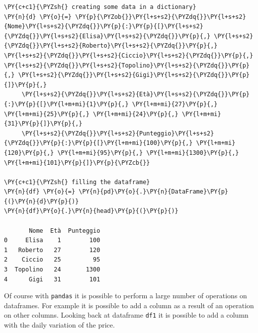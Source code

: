 \begin{tcolorbox}[breakable, size=fbox, boxrule=1pt, pad at break*=1mm,colback=cellbackground, colframe=cellborder]
\begin{Verbatim}[commandchars=\\\{\}]
\PY{c+c1}{\PYZsh{} creating some data in a dictionary}
\PY{n}{d} \PY{o}{=} \PY{p}{\PYZob{}}\PY{l+s+s2}{\PYZdq{}}\PY{l+s+s2}{Nome}\PY{l+s+s2}{\PYZdq{}}\PY{p}{:}\PY{p}{[}\PY{l+s+s2}{\PYZdq{}}\PY{l+s+s2}{Elisa}\PY{l+s+s2}{\PYZdq{}}\PY{p}{,} \PY{l+s+s2}{\PYZdq{}}\PY{l+s+s2}{Roberto}\PY{l+s+s2}{\PYZdq{}}\PY{p}{,} \PY{l+s+s2}{\PYZdq{}}\PY{l+s+s2}{Ciccio}\PY{l+s+s2}{\PYZdq{}}\PY{p}{,} \PY{l+s+s2}{\PYZdq{}}\PY{l+s+s2}{Topolino}\PY{l+s+s2}{\PYZdq{}}\PY{p}{,} \PY{l+s+s2}{\PYZdq{}}\PY{l+s+s2}{Gigi}\PY{l+s+s2}{\PYZdq{}}\PY{p}{]}\PY{p}{,}
     \PY{l+s+s2}{\PYZdq{}}\PY{l+s+s2}{Età}\PY{l+s+s2}{\PYZdq{}}\PY{p}{:}\PY{p}{[}\PY{l+m+mi}{1}\PY{p}{,} \PY{l+m+mi}{27}\PY{p}{,} \PY{l+m+mi}{25}\PY{p}{,} \PY{l+m+mi}{24}\PY{p}{,} \PY{l+m+mi}{31}\PY{p}{]}\PY{p}{,}
     \PY{l+s+s2}{\PYZdq{}}\PY{l+s+s2}{Punteggio}\PY{l+s+s2}{\PYZdq{}}\PY{p}{:}\PY{p}{[}\PY{l+m+mi}{100}\PY{p}{,} \PY{l+m+mi}{120}\PY{p}{,} \PY{l+m+mi}{95}\PY{p}{,} \PY{l+m+mi}{1300}\PY{p}{,} \PY{l+m+mi}{101}\PY{p}{]}\PY{p}{\PYZcb{}}

\PY{c+c1}{\PYZsh{} filling the dataframe}
\PY{n}{df} \PY{o}{=} \PY{n}{pd}\PY{o}{.}\PY{n}{DataFrame}\PY{p}{(}\PY{n}{d}\PY{p}{)}
\PY{n}{df}\PY{o}{.}\PY{n}{head}\PY{p}{(}\PY{p}{)}

       Nome  Età  Punteggio
0     Elisa    1        100
1   Roberto   27        120
2    Ciccio   25         95
3  Topolino   24       1300
4      Gigi   31        101
\end{Verbatim}
\end{tcolorbox}

Of course with \texttt{pandas} it is possible to perform a large number of operations on dataframes. 
For example it is possible to add a column as a result of an operation on other columns. 
Looking back at dataframe \texttt{df1} it is possible to add a column with the daily variation of the price.

